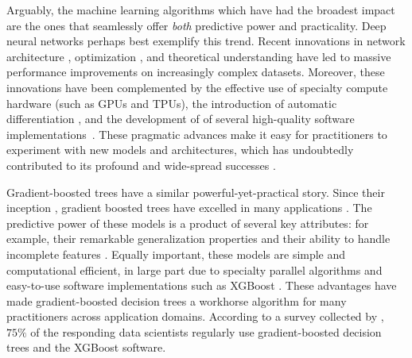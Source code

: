 Arguably, the machine learning algorithms which have had the broadest impact are the ones that seamlessly offer \emph{both} predictive power and practicality.
Deep neural networks perhaps best exemplify this trend.
Recent innovations in
network architecture \citep[e.g.][]{he2016deep,vaswani2017attention,devlin2018bert,huang2019convolutional},
optimization \citep[e.g.][]{ioffe2015batch,izmailov2018averaging},
and theoretical understanding \citep[e.g.][]{keskar2016large,jacot2018neural,arora2019fine}
have led to massive performance improvements on increasingly complex datasets.
Moreover, these innovations have been complemented by
the effective use of specialty compute hardware (such as GPUs and TPUs),
the introduction of automatic differentiation \citep[e.g.][]{paszke2017automatic},
and the development of of several high-quality software implementations~\citep[e.g.][]{jia2014caffe,abadi2016tensorflow,paszke2019pytorch}.
These pragmatic advances make it easy for practitioners to experiment with new models and architectures, which has undoubtedly contributed to its profound and wide-spread successes \cite{goodfellow2016deep}.

Gradient-boosted trees have a similar powerful-yet-practical story.
Since their inception \cite{friedman2001greedy,friedman2002stochastic}, gradient boosted trees have excelled in many applications \citep[e.g.][]{richardson2007predicting,burges2010ranknet}.
The predictive power of these models is a product of several key attributes: for example, their remarkable generalization properties \citep{freund1997decision,schapire2013boosting} and their ability to handle incomplete features \cite{friedman2001greedy}.
Equally important, these models are simple and computational efficient, in large part due to specialty parallel algorithms \citep[e.g.][]{tyree2011parallel,ke2017lightgbm} and easy-to-use software implementations such as XGBoost \cite{chen2016xgboost}.
These advantages have made gradient-boosted decision trees a workhorse algorithm for many practitioners across application domains.
According to a survey collected by \citet{kaggle2019kaggle}, $75\%$ of the responding data scientists regularly use gradient-boosted decision trees and the XGBoost software.

